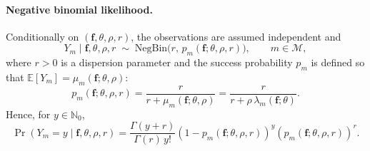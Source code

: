 \paragraph{Negative binomial likelihood.}
Conditionally on $(\bm f,\theta,\rho,r)$, the observations are assumed independent and
\[
Y_m \mid \bm f,\theta,\rho,r \;\sim\; \text{NegBin}\!\bigl(r,\,p_m(\bm f;\theta,\rho,r)\bigr),
\qquad m\in\mathcal{M},
\]
where $r>0$ is a dispersion parameter and the success probability $p_m$ is defined so that
$\mathbb{E}[Y_m]=\mu_m(\bm f;\theta,\rho)$:
\[
p_m(\bm f;\theta,\rho,r)
=
\frac{r}{r+\mu_m(\bm f;\theta,\rho)}
=
\frac{r}{r+\rho\,\lambda_m(\bm f;\theta)}.
\]
Hence, for $y\in\mathbb{N}_0$,
\[
\Pr(Y_m=y\mid \bm f,\theta,\rho,r)
=
\frac{\Gamma(y+r)}{\Gamma(r)\,y!}
\left(1-p_m(\bm f;\theta,\rho,r)\right)^y
\left(p_m(\bm f;\theta,\rho,r)\right)^r.
\]

